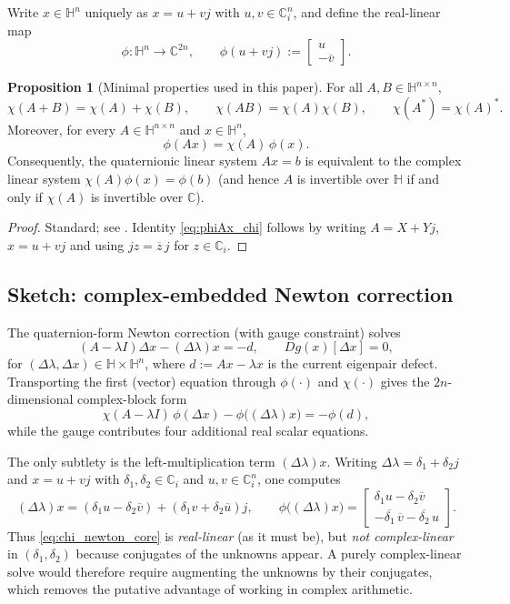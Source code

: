 \documentclass[preprint,12pt]{elsarticle}  %
\theoremstyle{definition}
\theoremstyle{definition}
\theoremstyle{definition}
\theoremstyle{definition}
\theoremstyle{definition}
\newtheorem{Pro}{Proposition}
\theoremstyle{remark}
\theoremstyle{remark}
\theoremstyle{remark}
\DeclareRobustCommand{\i}{\ensuremath{\mathbf{i}}}
\DeclareRobustCommand{\j}{\ensuremath{\mathbf{j}}}
\DeclareRobustCommand{\k}{\ensuremath{\mathbf{k}}}
\def\i{i}\def\j{j}\def\k{k}%
\newcommand{\CC}{\mathbb{C}}
\newcommand{\HH}{\mathbb{H}}
\begin{document}
Write $x\in\HH^n$ uniquely as $x=u+v\j$ with $u,v\in\CC_\i^n$, and define the real-linear map
\[
\phi:\HH^n\to\CC^{2n},\qquad
\phi(u+v\j):=\begin{bmatrix}u\\-\overline{v}\end{bmatrix}.
\]

\begin{Pro}[Minimal properties used in this paper]
\label{pro:chi_minimal_app}
For all $A,B\in\HH^{n\times n}$,
\[
\chi(A+B)=\chi(A)+\chi(B),\qquad \chi(AB)=\chi(A)\chi(B),\qquad \chi(A^\ast)=\chi(A)^\ast.
\]
Moreover, for every $A\in\HH^{n\times n}$ and $x\in\HH^n$,
\begin{equation}
\label{eq:phiAx_chi}
\phi(Ax)=\chi(A)\,\phi(x).
\end{equation}
Consequently, the quaternionic linear system $Ax=b$ is equivalent to the complex linear system
$\chi(A)\phi(x)=\phi(b)$ (and hence $A$ is invertible over $\HH$ if and only if $\chi(A)$ is invertible over $\CC$).
\end{Pro}

\begin{proof}
Standard; see \cite{Zhang1997,Rodman2014}. Identity \eqref{eq:phiAx_chi} follows by writing $A=X+Y\j$, $x=u+v\j$ and using
$\j z=\overline{z}\,\j$ for $z\in\CC_\i$.
\end{proof}

\subsection{Sketch: complex-embedded Newton correction}
The quaternion-form Newton correction (with gauge constraint) solves
\[
(A-\lambda I)\Delta x-(\Delta\lambda)x=-d,\qquad Dg(x)[\Delta x]=0,
\]
for $(\Delta\lambda,\Delta x)\in\HH\times\HH^n$, where $d:=Ax-\lambda x$ is the current eigenpair defect.
Transporting the first (vector) equation through $\phi(\cdot)$ and $\chi(\cdot)$ gives the $2n$-dimensional complex-block form
\begin{equation}
\label{eq:chi_newton_core}
\chi(A-\lambda I)\,\phi(\Delta x)-\phi\bigl((\Delta\lambda)x\bigr)=-\phi(d),
\end{equation}
while the gauge contributes four additional real scalar equations.

The only subtlety is the left-multiplication term $(\Delta\lambda)x$. Writing $\Delta\lambda=\delta_1+\delta_2\j$ and
$x=u+v\j$ with $\delta_1,\delta_2\in\CC_\i$ and $u,v\in\CC_\i^n$, one computes
\[
(\Delta\lambda)x=(\delta_1 u-\delta_2\overline{v})+(\delta_1 v+\delta_2\overline{u})\j,
\qquad
\phi\bigl((\Delta\lambda)x\bigr)=
\begin{bmatrix}
\delta_1 u-\delta_2\overline{v}\\
-\overline{\delta_1}\,\overline{v}-\overline{\delta_2}\,u
\end{bmatrix}.
\]
Thus \eqref{eq:chi_newton_core} is \emph{real-linear} (as it must be), but \emph{not complex-linear} in $(\delta_1,\delta_2)$ because
conjugates of the unknowns appear. A purely complex-linear solve would therefore require augmenting the unknowns by their conjugates, which removes the putative advantage of working in complex arithmetic.
\end{document}
